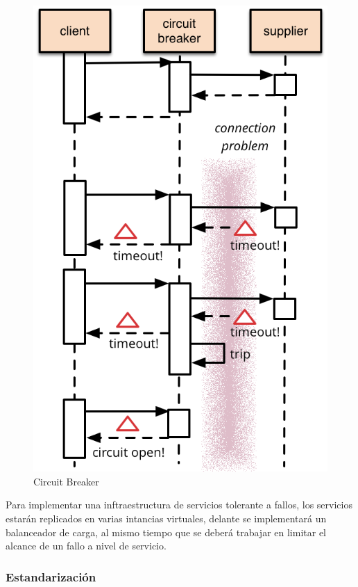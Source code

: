 \begin{figure}
  \includegraphics[width=\linewidth]{src/images/04-capitulo-4/circuit_breaker.png}
  \caption{Circuit Breaker}
  \label{fig:circuit_breaker}
\end{figure}

Para implementar una inftraestructura de servicios tolerante a fallos, los servicios estarán replicados en varias intancias virtuales, delante se implementará un balanceador de carga, al mismo tiempo que se deberá trabajar en limitar el alcance de un fallo a nivel de servicio.


\subsubsection{Estandarización}

